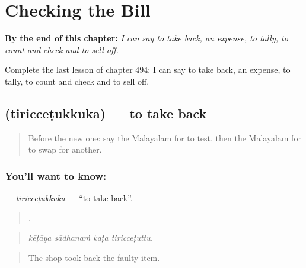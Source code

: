 
\chapter{Checking the Bill}
\label{ch:ml-checking-the-bill}

\begin{chapteropening}
\textbf{By the end of this chapter:} \emph{I can say to take back, an expense, to tally, to count and check and to sell off.}

Complete the last lesson of chapter 494: I can say to take back, an expense, to tally, to count and check and to sell off.
\end{chapteropening}

\section[\texorpdfstring{\ml{തിരിച്ചെടുക്കുക} (tiricceṭukkuka)}{തിരിച്ചെടുക്കുക (tiricceṭukkuka)}]{ (tiricceṭukkuka) — to take back}

\label{lesson:ML-C494-tiriccetukkuka}



\begin{quote}
Before the new one: say the Malayalam for to test, then the Malayalam for to swap for another.
\end{quote}

\subsection*{You'll want to know: }
\textbf{} — \emph{tiricceṭukkuka} — \textquotedblleft{}to take back\textquotedblright{}.

\begin{quote}
   .
\end{quote}

\begin{quote}
\emph{kēṭāya sādhanaṁ kaṭa tiricceṭuttu.}
\end{quote}

\begin{quote}
The shop took back the faulty item.
\end{quote}

